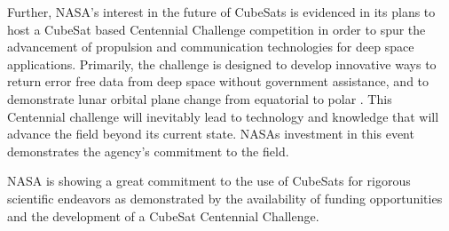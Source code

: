 \documentclass[11pt]{article}
\begin{document}
Further, NASA’s interest in the future of CubeSats is evidenced in its plans to host a CubeSat based Centennial Challenge competition in order to spur the advancement of propulsion and communication technologies for deep space applications. Primarily, the challenge is designed to develop innovative ways to return error free data from deep space without government assistance, and to demonstrate lunar orbital plane change from equatorial to polar \cite{solicitation}. This Centennial challenge will inevitably lead to technology and knowledge that will advance the field beyond its current state. NASAs investment in this event demonstrates the agency’s commitment to the field. 

NASA is showing a great commitment to the use of CubeSats for rigorous scientific endeavors as demonstrated by the availability of funding opportunities and the development of a CubeSat Centennial Challenge. 




\end{document}
